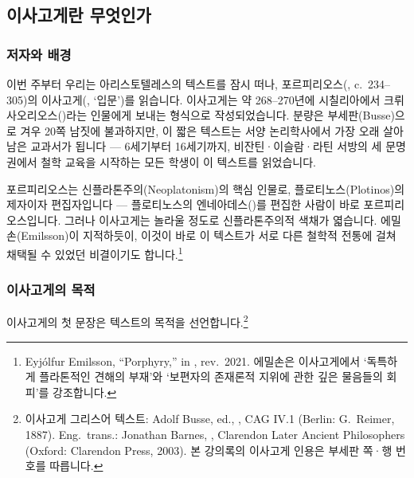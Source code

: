 \documentclass[12pt, a4paper]{article}
\begin{document}
\thispagestyle{firstpage}


\subsection{이사고게란 무엇인가}

\subsubsection{저자와 배경}

이번 주부터 우리는 아리스토텔레스의 텍스트를 잠시 떠나, 포르피리오스(, c.\ 234--305)의 이사고게(, `입문')를 읽습니다. 이사고게는 약 268--270년에 시칠리아에서 크뤼사오리오스()라는 인물에게 보내는 형식으로 작성되었습니다. 분량은 부세판(Busse)으로 겨우 20쪽 남짓에 불과하지만, 이 짧은 텍스트는 서양 논리학사에서 가장 오래 살아남은 교과서가 됩니다 --- 6세기부터 16세기까지, 비잔틴·이슬람·라틴 서방의 세 문명권에서 철학 교육을 시작하는 모든 학생이 이 텍스트를 읽었습니다.

포르피리오스는 신플라톤주의(Neoplatonism)의 핵심 인물로, 플로티노스(Plotinos)의 제자이자 편집자입니다 --- 플로티노스의 엔네아데스()를 편집한 사람이 바로 포르피리오스입니다. 그러나 이사고게는 놀라울 정도로 신플라톤주의적 색채가 엷습니다. 에밀손(Emilsson)이 지적하듯이, 이것이 바로 이 텍스트가 서로 다른 철학적 전통에 걸쳐 채택될 수 있었던 비결이기도 합니다.\footnote{Eyjólfur Emilsson, ``Porphyry,'' in , rev.\ 2021. 에밀손은 이사고게에서 `독특하게 플라톤적인 견해의 부재'와 `보편자의 존재론적 지위에 관한 깊은 물음들의 회피'를 강조합니다.}

\subsubsection{이사고게의 목적}

이사고게의 첫 문장은 텍스트의 목적을 선언합니다.\footnote{이사고게 그리스어 텍스트: Adolf Busse, ed., , CAG IV.1 (Berlin: G.\ Reimer, 1887). Eng.\ trans.: Jonathan Barnes, , Clarendon Later Ancient Philosophers (Oxford: Clarendon Press, 2003). 본 강의록의 이사고게 인용은 부세판 쪽·행 번호를 따릅니다.}

\end{document}
